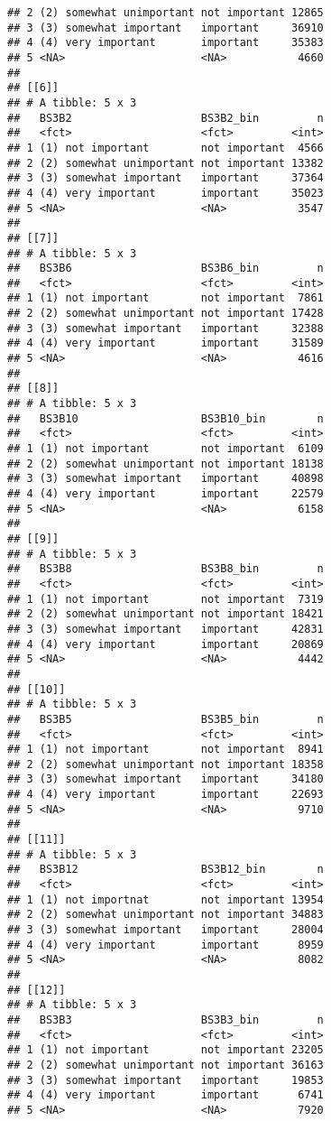 \documentclass[]{article}
\begin{document}
\begin{verbatim}
## 2 (2) somewhat unimportant not important 12865
## 3 (3) somewhat important   important     36910
## 4 (4) very important       important     35383
## 5 <NA>                     <NA>           4660
## 
## [[6]]
## # A tibble: 5 x 3
##   BS3B2                    BS3B2_bin         n
##   <fct>                    <fct>         <int>
## 1 (1) not important        not important  4566
## 2 (2) somewhat unimportant not important 13382
## 3 (3) somewhat important   important     37364
## 4 (4) very important       important     35023
## 5 <NA>                     <NA>           3547
## 
## [[7]]
## # A tibble: 5 x 3
##   BS3B6                    BS3B6_bin         n
##   <fct>                    <fct>         <int>
## 1 (1) not important        not important  7861
## 2 (2) somewhat unimportant not important 17428
## 3 (3) somewhat important   important     32388
## 4 (4) very important       important     31589
## 5 <NA>                     <NA>           4616
## 
## [[8]]
## # A tibble: 5 x 3
##   BS3B10                   BS3B10_bin        n
##   <fct>                    <fct>         <int>
## 1 (1) not important        not important  6109
## 2 (2) somewhat unimportant not important 18138
## 3 (3) somewhat important   important     40898
## 4 (4) very important       important     22579
## 5 <NA>                     <NA>           6158
## 
## [[9]]
## # A tibble: 5 x 3
##   BS3B8                    BS3B8_bin         n
##   <fct>                    <fct>         <int>
## 1 (1) not important        not important  7319
## 2 (2) somewhat unimportant not important 18421
## 3 (3) somewhat important   important     42831
## 4 (4) very important       important     20869
## 5 <NA>                     <NA>           4442
## 
## [[10]]
## # A tibble: 5 x 3
##   BS3B5                    BS3B5_bin         n
##   <fct>                    <fct>         <int>
## 1 (1) not important        not important  8941
## 2 (2) somewhat unimportant not important 18358
## 3 (3) somewhat important   important     34180
## 4 (4) very important       important     22693
## 5 <NA>                     <NA>           9710
## 
## [[11]]
## # A tibble: 5 x 3
##   BS3B12                   BS3B12_bin        n
##   <fct>                    <fct>         <int>
## 1 (1) not importnat        not important 13954
## 2 (2) somewhat unimportant not important 34883
## 3 (3) somewhat important   important     28004
## 4 (4) very important       important      8959
## 5 <NA>                     <NA>           8082
## 
## [[12]]
## # A tibble: 5 x 3
##   BS3B3                    BS3B3_bin         n
##   <fct>                    <fct>         <int>
## 1 (1) not important        not important 23205
## 2 (2) somewhat unimportant not important 36163
## 3 (3) somewhat important   important     19853
## 4 (4) very important       important      6741
## 5 <NA>                     <NA>           7920
\end{verbatim}
\end{document}
